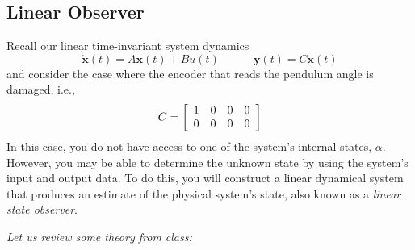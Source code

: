 \documentclass[12pt]{report}
\begin{document}
\subsection{Linear Observer}\label{subsection:lab3_observer}
Recall our linear time-invariant system dynamics
\[\mathbf{\dot{x}}(t)=A\mathbf{x}(t)+Bu(t) \quad \quad \quad \mathbf{y}(t)=C\mathbf{x}(t)\]
and consider the case where the encoder that reads the pendulum angle is damaged, i.e.,
\[C = \left[\begin{array}{c c c c}
            1 & 0 & 0 & 0 \\
            0 & 0 & 0 & 0
        \end{array}\right]\]
In this case, you do not have access to one of the system's internal states, $\alpha$. However, you may be able to determine the unknown state by using the system's input and output data. To do this, you will construct a linear dynamical system that produces an estimate of the physical system's state, also known as a \emph{linear state observer}.

\noindent \emph{Let us review some theory from class:}
\end{document}
